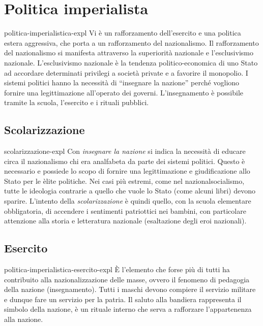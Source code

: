 \documentclass[preview]{standalone}
\begin{document}
\section{Politica imperialista}

\begin{snippet}{politica-imperialistica-expl}
    Vi è un rafforzamento dell'esercito e una politica estera aggressiva, che porta a un
    rafforzamento del nazionalismo. Il rafforzamento del nazionalismo si manifesta attraverso la
    superiorità nazionale e l'esclusivismo nazionale. L'esclusivismo nazionale è la tendenza
    politico-economica di uno Stato ad accordare determinati privilegi a società private e a
    favorire il monopolio. I sistemi politici hanno la necessità di “insegnare la nazione” perché
    vogliono fornire una legittimazione all'operato dei governi. L'insegnamento è possibile
    tramite la scuola, l'esercito e i rituali pubblici.
\end{snippet}

\subsection{Scolarizzazione}

\begin{snippet}{scolarizzazione-expl}
    Con \textit{insegnare la nazione} si indica la necessità di educare circa il nazionalismo
    chi era analfabeta da parte dei sistemi politici.
    Questo è necessario e possiede lo scopo di fornire una legittimazione e
    giudificazione allo Stato per le èlite politiche.
    Nei casi più estremi, come nel nazionalsocialismo, tutte le ideologia
    contrarie a quello che vuole lo Stato (come alcuni libri) devono sparire.
    L'intento della \textit{scolarizzazione} è quindi quello,
    con la scuola elementare obbligatoria, di accendere i sentimenti patriottici nei bambini,
    con particolare attenzione alla storia e letteratura nazionale (esaltazione degli eroi nazionali).
\end{snippet}

\subsection{Esercito}

\begin{snippet}{politica-imperialistica-esercito-expl}
    È l'elemento che forse più di tutti ha contribuito alla nazionalizzazione delle masse,
    ovvero il fenomeno di pedagogia della nazione (insegnamento).
    Tutti i maschi devono compiere il servizio militare e dunque fare un servizio per la patria.
    Il saluto alla bandiera rappresenta il simbolo della nazione, è un rituale
    interno che serva a rafforzare l'appartenenza alla nazione.
\end{snippet}
\end{document}
